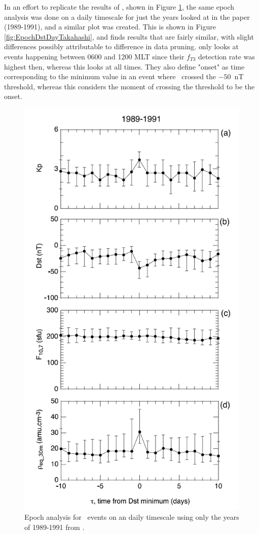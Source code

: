 In an effort to replicate the results of \cite{Takahashi2010SolarCycleVariation}, shown in Figure \ref{fig:EpochTakahashi}, the same epoch analysis was done on a daily timescale for just the years looked at in the paper (1989-1991), and a similar plot was created. This is shown in Figure \ref{fig:EpochDstDayTakahashi}, and finds results that are fairly similar, with slight differences possibly attributable to difference in data pruning. \cite{Takahashi2010SolarCycleVariation} only looks at events happening between 0600 and 1200 MLT since their $f_{T3}$ detection rate was highest then, whereas this looks at all times. They also define "onset" as time corresponding to the minimum value in an event where \dst\ crossed the $-50$~nT threshold, whereas this considers the moment of crossing the threshold to be the onset.

\begin{figure}[htp!]
	\centering
	\includegraphics[width=0.7\linewidth]{Figures/StormAvs/stormavs-Takahashi.png}
	\caption{Epoch analysis for \dst\ events on an daily timescale using only the years of 1989-1991 from \citep{Takahashi2010SolarCycleVariation}.}
	\label{fig:EpochTakahashi}
\end{figure}

